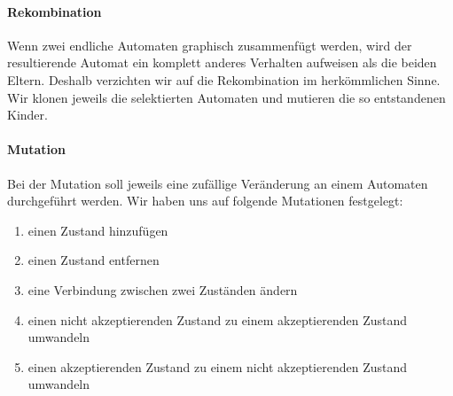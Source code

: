 \paragraph{Rekombination}
Wenn zwei endliche Automaten graphisch zusammenfügt werden, wird der resultierende Automat ein komplett anderes Verhalten aufweisen als die beiden Eltern. Deshalb verzichten wir auf die Rekombination im herkömmlichen Sinne. Wir klonen jeweils die selektierten Automaten und mutieren die so entstandenen Kinder.

\paragraph{Mutation}
Bei der Mutation soll jeweils eine zufällige Veränderung an einem Automaten durchgeführt werden. Wir haben uns auf folgende Mutationen festgelegt:
\begin{enumerate}
	\item einen Zustand hinzufügen
	\item einen Zustand entfernen
	\item eine Verbindung zwischen zwei Zuständen ändern
	\item einen nicht akzeptierenden Zustand zu einem akzeptierenden Zustand umwandeln
	\item einen akzeptierenden Zustand zu einem nicht akzeptierenden Zustand umwandeln
\end{enumerate}